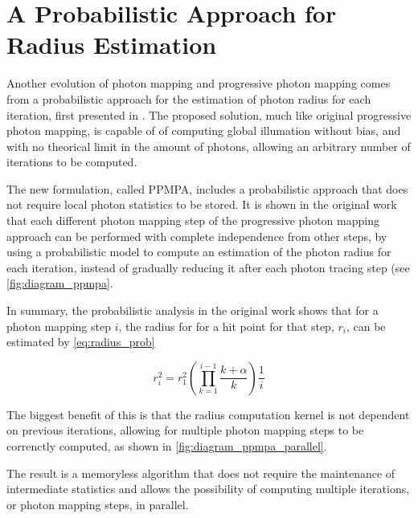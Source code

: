 \documentclass[main.tex]{subfiles}
\begin{document}
\section{A Probabilistic Approach for Radius Estimation} \label{section:ppmpa}


Another evolution of photon mapping and progressive photon mapping comes from a probabilistic approach for the estimation of photon radius for each iteration, first presented in \cite{knaus2011progressive}. The proposed solution, much like original progressive photon mapping, is capable of of computing global illumation without bias, and with no theorical limit in the amount of photons, allowing an arbitrary number of iterations to be computed.

The new formulation, called PPMPA, includes a probabilistic approach that does not require local photon statistics to be stored. It is shown in the original work that each different photon mapping step of the progressive photon mapping approach can be performed with complete independence from other steps, by using a probabilistic model to compute an estimation of the photon radius for each iteration, instead of gradually reducing it after each photon tracing step (see \cref{fig:diagram_ppmpa}.


In summary, the probabilistic analysis in the original work shows that for a photon mapping step $i$, the radius for for a hit point for that step, $r_{i}$, can be estimated by \cref{eq:radius_prob}

\begin{figure}[!htp]
  \begin{equation}
    r^{2}_{i} = r^{2}_{1} (\prod\limits^{i-1}_{k=1} \frac{k + \alpha}{k}) \frac{1}{i}
  \label{eq:radius_prob}
  \end{equation}
\end{figure}


The biggest benefit of this is that the radius computation kernel is not dependent on previous iterations, allowing for multiple photon mapping steps to be correnctly computed, as shown in \cref{fig:diagram_ppmpa_parallel}.


The result is a memoryless algorithm that does not require the maintenance of intermediate statistics and allows the possibility of computing multiple iterations, or photon mapping steps, in parallel.

\end{document}
